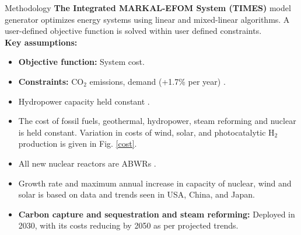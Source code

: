 \documentclass[final]{beamer}
\newlength{\onecolwid}
\newlength{\twocolwid}
\newlength{\threecolwid}
\begin{document}
\begin{frame}[t]
\begin{columns}[t,totalwidth=\threecolwid]
\begin{column}{\twocolwid}
\begin{columns}[t,totalwidth=\twocolwid]


\begin{column}{\onecolwid} %


\begin{block}{Methodology}
        \textbf{The Integrated MARKAL-EFOM System (TIMES)} model generator 
        \cite{loulou_documentation_2005} 
        \cite{seebregts_energy/environmental_2002} optimizes energy systems 
        using linear and mixed-linear algorithms. A user-defined objective 
        function is solved within user defined constraints.\\
\textbf{Key assumptions:}

\begin{itemize}
        \item\textbf{Objective function:} System cost. 
        
         \item\textbf{Constraints:} CO$_2$ emissions, demand (+1.7\% per year) \cite{noauthor_electricity_2017}.
         
         \item Hydropower capacity held constant \cite{noauthor_energy_2018}.
         
         \item The cost of fossil fuels, geothermal, hydropower, steam reforming and nuclear is held constant. Variation in costs of wind, solar, and photocatalytic H$_2$ production is given in Fig. \ref{cost}.
         
         \item All new nuclear reactors are ABWRs \cite{rothwell_real_2006}.
         
         \item Growth rate and maximum annual increase in capacity of nuclear, wind and solar is based on data and trends seen in USA, China, and Japan. \cite{noauthor_electricity_2017,noauthor_energy_2018,eia_international_nodate,eia_monthly_2018,iea-pvps_snapshot_2018}
         
         \item \textbf{Carbon capture and sequestration and steam reforming:} Deployed in 2030, with its costs reducing by 2050 as per projected trends. \cite{kato_energy_2016}
         

\end{itemize}
\end{block}
\end{column}
\end{columns}
\end{column}
\end{columns}
\end{frame}
\end{document}
